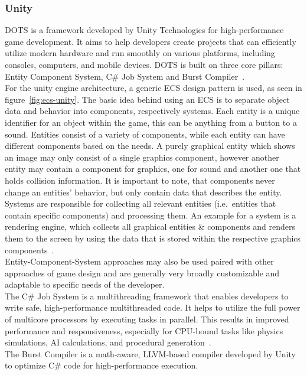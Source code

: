 \subsubsection{Unity}\label{subsubsec:entity-component-system}
\gls{DOTS} is a framework developed by Unity Technologies for high-performance game development.
It aims to help developers create projects that can efficiently utilize modern hardware and run smoothly on various platforms,
including consoles, computers, and mobile devices.
\gls{DOTS} is built on three core pillars: Entity Component System, C\# Job System and Burst Compiler~\cite{dots}.
\\
For the unity engine architecture, a generic \gls{ECS} design pattern is used, as seen in figure~\ref{fig:ecs-unity}.
The basic idea behind using an \gls{ECS} is to separate object data and behavior into components, respectively systems.
Each entity is a unique identifier for an object within the game, this can be anything from a button to a sound.
Entities consist of a variety of components, while each entity can have different components based on the needs.
A purely graphical entity which shows an image may only consist of a single graphics component, however another entity may contain
a component for graphics, one for sound and another one that holds collision information.
It is important to note, that components never change an entities' behavior, but only contain data that describes the entity.
Systems are responsible for collecting all relevant entities (i.e.\ entities that contain specific components) and processing them.
An example for a system is a rendering engine, which collects all graphical entities \& components and renders them to the screen by
using the data that is stored within the respective graphics components~\cite{dots}.
\\
Entity-Component-System approaches may also be used paired with other approaches of game design and are generally very broadly customizable and adaptable
to specific needs of the developer.
\\
The C\# Job System is a multithreading framework that enables developers to write safe, high-performance multithreaded code.
It helps to utilize the full power of multicore processors by executing tasks in parallel.
This results in improved performance and responsiveness, especially for \gls{CPU}-bound tasks like physics simulations, AI calculations, and procedural generation~\cite{dots}.
\\
The Burst Compiler is a math-aware, \gls{LLVM}-based compiler developed by Unity to optimize C\# code for high-performance execution.
